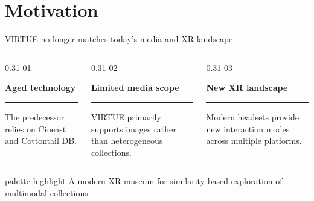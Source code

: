 \section{Motivation}
\begin{frame}[c]{VIRTUE no longer matches today's media and XR landscape}
\begin{columns}[T,onlytextwidth]
  \begin{column}{0.31\textwidth}
    \textcolor{unired}{\LARGE 01}

    \vspace{0.08cm}
    \large\textbf{Aged technology}

    \vspace{0.12cm}
    \color{unimint}\rule{\linewidth}{1.6pt}
    \color{black}

    \vspace{0.20cm}
    \small
    The predecessor relies on Cineast and Cottontail DB.
  \end{column}

  \begin{column}{0.31\textwidth}
    \textcolor{unired}{\LARGE 02}

    \vspace{0.08cm}
    \large\textbf{Limited media scope}

    \vspace{0.12cm}
    \color{unimint}\rule{\linewidth}{1.6pt}
    \color{black}

    \vspace{0.20cm}
    \small
    VIRTUE primarily supports images rather than heterogeneous collections.
  \end{column}

  \begin{column}{0.31\textwidth}
    \textcolor{unired}{\LARGE 03}

    \vspace{0.08cm}
    \large\textbf{New XR landscape}

    \vspace{0.12cm}
    \color{unimint}\rule{\linewidth}{1.6pt}
    \color{black}

    \vspace{0.20cm}
    \small
    Modern headsets provide new interaction modes across multiple platforms.
  \end{column}
\end{columns}

\vspace{0.60cm}
\begin{beamercolorbox}[sep=0.62em,rounded=true]{palette highlight}
  \centering\large
  A modern XR museum for similarity-based exploration of multimodal collections.
\end{beamercolorbox}
\end{frame}
